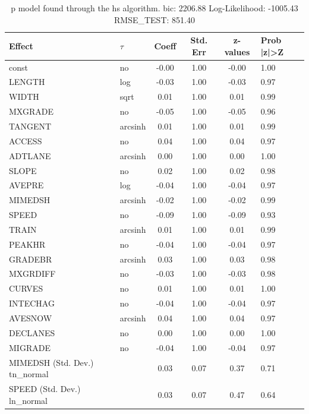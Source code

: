 \begin{table}
	\caption{p model found through the hs algorithm. bic: 2206.88 Log-Likelihood: -1005.43 RMSE_TEST: 851.40}
	\begin{center}
		\begin{tabular}{|l|l|c|c|c|l|}
			\hline
			Effect & $\tau$ & Coeff & Std. Err & z-values & Prob |z|>Z \\
			\hline
			const & no & -0.00 & 1.00 & -0.00 & 1.00 \\
			\hline
			LENGTH & log & -0.03 & 1.00 & -0.03 & 0.97 \\
			\hline
			WIDTH & sqrt & 0.01 & 1.00 & 0.01 & 0.99 \\
			\hline
			MXGRADE & no & -0.05 & 1.00 & -0.05 & 0.96 \\
			\hline
			TANGENT & arcsinh & 0.01 & 1.00 & 0.01 & 0.99 \\
			\hline
			ACCESS & no & 0.04 & 1.00 & 0.04 & 0.97 \\
			\hline
			ADTLANE & arcsinh & 0.00 & 1.00 & 0.00 & 1.00 \\
			\hline
			SLOPE & no & 0.02 & 1.00 & 0.02 & 0.98 \\
			\hline
			AVEPRE & log & -0.04 & 1.00 & -0.04 & 0.97 \\
			\hline
			MIMEDSH & arcsinh & -0.02 & 1.00 & -0.02 & 0.99 \\
			\hline
			SPEED & no & -0.09 & 1.00 & -0.09 & 0.93 \\
			\hline
			TRAIN & arcsinh & 0.01 & 1.00 & 0.01 & 0.99 \\
			\hline
			PEAKHR & no & -0.04 & 1.00 & -0.04 & 0.97 \\
			\hline
			GRADEBR & arcsinh & 0.03 & 1.00 & 0.03 & 0.98 \\
			\hline
			MXGRDIFF & no & -0.03 & 1.00 & -0.03 & 0.98 \\
			\hline
			CURVES & no & 0.01 & 1.00 & 0.01 & 1.00 \\
			\hline
			INTECHAG & no & -0.04 & 1.00 & -0.04 & 0.97 \\
			\hline
			AVESNOW & arcsinh & 0.04 & 1.00 & 0.04 & 0.97 \\
			\hline
			DECLANES & no & 0.00 & 1.00 & 0.00 & 1.00 \\
			\hline
			MIGRADE & no & -0.04 & 1.00 & -0.04 & 0.97 \\
			\hline
			MIMEDSH (Std. Dev.) tn_normal &  & 0.03 & 0.07 & 0.37 & 0.71 \\
			\hline
			SPEED (Std. Dev.) ln_normal &  & 0.03 & 0.07 & 0.47 & 0.64 \\

\end{tabular}
\end{center}
\end{table}
